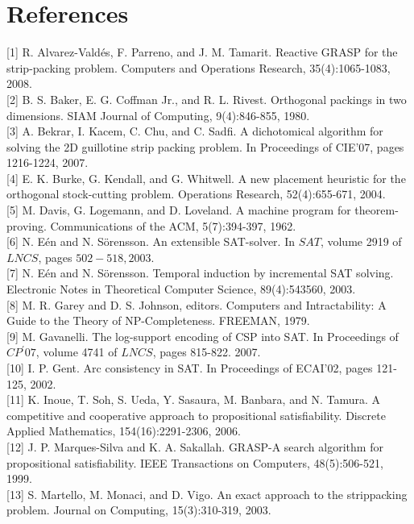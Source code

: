 \documentclass[10pt]{article}
\begin{document}
\section*{References}
[1] R. Alvarez-Valdés, F. Parreno, and J. M. Tamarit. Reactive GRASP for the strip-packing problem. Computers and Operations Research, 35(4):1065-1083, 2008.\\[0pt]
[2] B. S. Baker, E. G. Coffman Jr., and R. L. Rivest. Orthogonal packings in two dimensions. SIAM Journal of Computing, 9(4):846-855, 1980.\\[0pt]
[3] A. Bekrar, I. Kacem, C. Chu, and C. Sadfi. A dichotomical algorithm for solving the 2D guillotine strip packing problem. In Proceedings of CIE'07, pages 1216-1224, 2007.\\[0pt]
[4] E. K. Burke, G. Kendall, and G. Whitwell. A new placement heuristic for the orthogonal stock-cutting problem. Operations Research, 52(4):655-671, 2004.\\[0pt]
[5] M. Davis, G. Logemann, and D. Loveland. A machine program for theorem-proving. Communications of the ACM, 5(7):394-397, 1962.\\[0pt]
[6] N. Eén and N. Sörensson. An extensible SAT-solver. In $S A T$, volume 2919 of $L N C S$, pages $502-518,2003$.\\[0pt]
[7] N. Eén and N. Sörensson. Temporal induction by incremental SAT solving. Electronic Notes in Theoretical Computer Science, 89(4):543560, 2003.\\[0pt]
[8] M. R. Garey and D. S. Johnson, editors. Computers and Intractability: A Guide to the Theory of NP-Completeness. FREEMAN, 1979.\\[0pt]
[9] M. Gavanelli. The log-support encoding of CSP into SAT. In Proceedings of $C P^{\prime} 07$, volume 4741 of $L N C S$, pages 815-822. 2007.\\[0pt]
[10] I. P. Gent. Arc consistency in SAT. In Proceedings of ECAI'02, pages 121-125, 2002.\\[0pt]
[11] K. Inoue, T. Soh, S. Ueda, Y. Sasaura, M. Banbara, and N. Tamura. A competitive and cooperative approach to propositional satisfiability. Discrete Applied Mathematics, 154(16):2291-2306, 2006.\\[0pt]
[12] J. P. Marques-Silva and K. A. Sakallah. GRASP-A search algorithm for propositional satisfiability. IEEE Transactions on Computers, 48(5):506-521, 1999.\\[0pt]
[13] S. Martello, M. Monaci, and D. Vigo. An exact approach to the strippacking problem. Journal on Computing, 15(3):310-319, 2003.\\[0pt]
\end{document}

